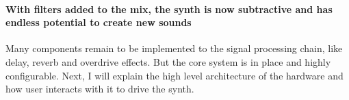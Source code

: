 \documentclass[acmlarge,screen]{acmart}
\begin{document}
	\paragraph{With filters added to the mix, the synth is now subtractive and has endless potential to create new sounds} Many components remain to be implemented to the signal processing chain, like delay, reverb and overdrive effects. But the core system is in place and highly configurable. Next, I will explain the high level architecture of the hardware and how user interacts with it to drive the synth.
%	
%	
%
\end{document}
